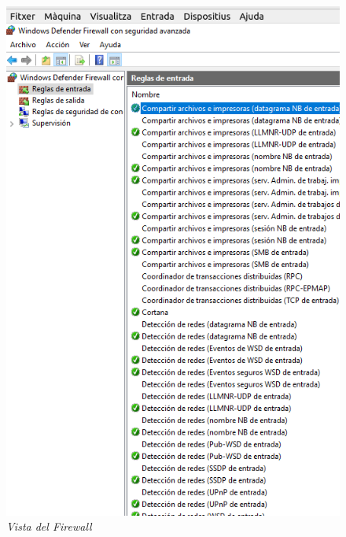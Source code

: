 \documentclass[
  a4paper,
]{article}
\begin{document}
\begin{figure}
\centering
\includegraphics{png/ExemplesEnFirewall.png}
\caption{\emph{Vista del Firewall}}
\end{figure}
\end{document}
